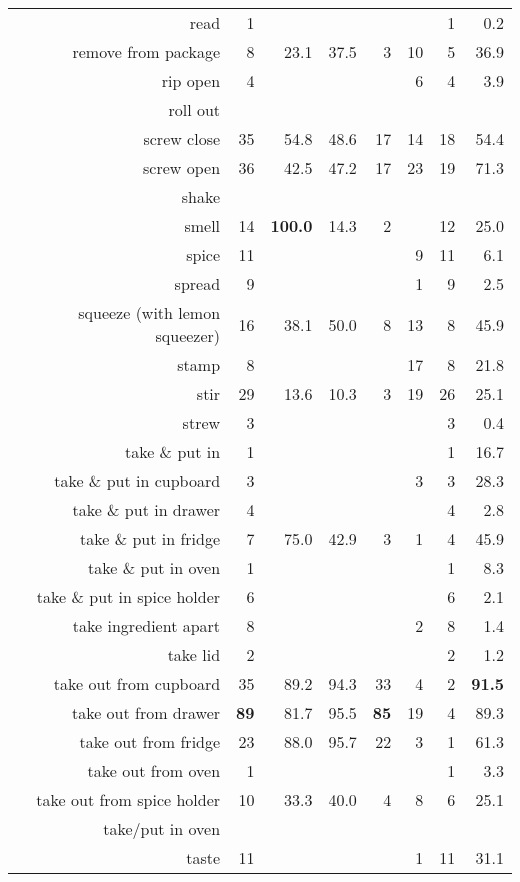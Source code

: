 \begin{tabular}{r r r@{\ \ }r@{\ \ }r@{\ \ }r@{\ \ }r r}
read & 1 &  &  &  &  & 1 & 0.2 \\
remove from package & 8 & 23.1 & 37.5 & 3 & 10 & 5 & 36.9 \\
rip open & 4 &  &  &  & 6 & 4 & 3.9 \\
roll out &  &  &  &  &  &  &  \\
screw close & 35 & 54.8 & 48.6 & 17 & 14 & 18 & 54.4 \\
screw open & 36 & 42.5 & 47.2 & 17 & 23 & 19 & 71.3 \\
shake &  &  &  &  &  &  &  \\
smell & 14 & \textbf{100.0} & 14.3 & 2 &  & 12 & 25.0 \\
spice & 11 &  &  &  & 9 & 11 & 6.1 \\
spread & 9 &  &  &  & 1 & 9 & 2.5 \\
squeeze (with lemon squeezer) & 16 & 38.1 & 50.0 & 8 & 13 & 8 & 45.9 \\
stamp & 8 &  &  &  & 17 & 8 & 21.8 \\
stir & 29 & 13.6 & 10.3 & 3 & 19 & 26 & 25.1 \\
strew & 3 &  &  &  &  & 3 & 0.4 \\
take \& put in  & 1 &  &  &  &  & 1 & 16.7 \\
take \& put in cupboard & 3 &  &  &  & 3 & 3 & 28.3 \\
take \& put in drawer & 4 &  &  &  &  & 4 & 2.8 \\
take \& put in fridge & 7 & 75.0 & 42.9 & 3 & 1 & 4 & 45.9 \\
take \& put in oven & 1 &  &  &  &  & 1 & 8.3 \\
take \& put in spice holder & 6 &  &  &  &  & 6 & 2.1 \\
take ingredient apart & 8 &  &  &  & 2 & 8 & 1.4 \\
take lid & 2 &  &  &  &  & 2 & 1.2 \\
take out from cupboard & 35 & 89.2 & 94.3 & 33 & 4 & 2 & \textbf{91.5} \\
take out from drawer & \textbf{89} & 81.7 & 95.5 & \textbf{85} & 19 & 4 & 89.3 \\
take out from fridge & 23 & 88.0 & 95.7 & 22 & 3 & 1 & 61.3 \\
take out from oven & 1 &  &  &  &  & 1 & 3.3 \\
take out from spice holder & 10 & 33.3 & 40.0 & 4 & 8 & 6 & 25.1 \\
take/put in oven &  &  &  &  &  &  &  \\
taste & 11 &  &  &  & 1 & 11 & 31.1 \\

\end{tabular}
